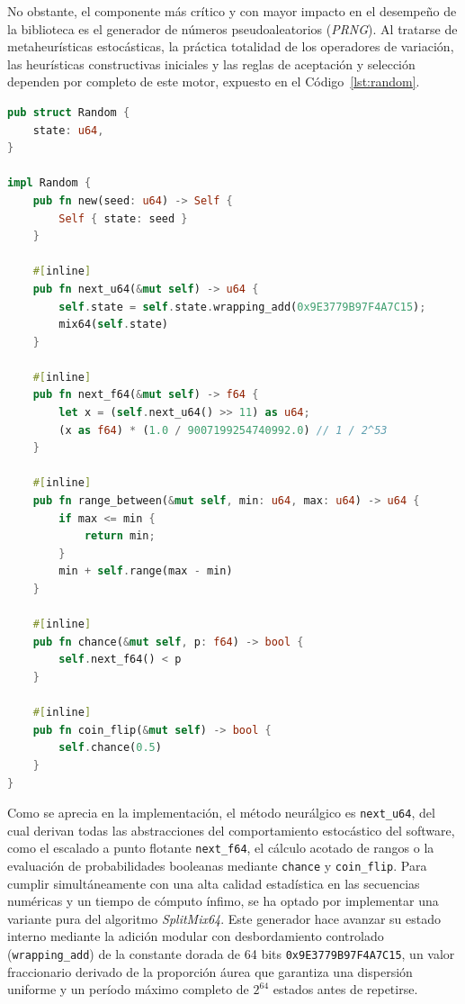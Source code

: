 \documentclass[12pt,a4paper,twoside,openright]{book}
\begin{document}
    No obstante, el componente más crítico y con mayor impacto en el desempeño de la biblioteca es el generador de números pseudoaleatorios (\textit{PRNG}). Al tratarse de metaheurísticas estocásticas, la práctica totalidad de los operadores de variación, las heurísticas constructivas iniciales y las reglas de aceptación y selección dependen por completo de este motor, expuesto en el Código~\ref{lst:random}.

    \begin{lstlisting}[language=Rust, caption={Implementación del generador de números pseudoaleatorios (\textit{PRNG}).}, label={lst:random}]
pub struct Random {
    state: u64,
}

impl Random {
    pub fn new(seed: u64) -> Self {
        Self { state: seed }
    }

    #[inline]
    pub fn next_u64(&mut self) -> u64 {
        self.state = self.state.wrapping_add(0x9E3779B97F4A7C15);
        mix64(self.state)
    }
    
    #[inline]
    pub fn next_f64(&mut self) -> f64 {
        let x = (self.next_u64() >> 11) as u64;
        (x as f64) * (1.0 / 9007199254740992.0) // 1 / 2^53
    }

    #[inline]
    pub fn range_between(&mut self, min: u64, max: u64) -> u64 {
        if max <= min {
            return min;
        }
        min + self.range(max - min)
    }

    #[inline]
    pub fn chance(&mut self, p: f64) -> bool {
        self.next_f64() < p
    }

    #[inline]
    pub fn coin_flip(&mut self) -> bool {
        self.chance(0.5)
    }
}

    \end{lstlisting}
        
        Como se aprecia en la implementación, el método neurálgico es \texttt{next\_u64}, del cual derivan todas las abstracciones del comportamiento estocástico del software, como el escalado a punto flotante \texttt{next\_f64}, el cálculo acotado de rangos o la evaluación de probabilidades booleanas mediante \texttt{chance} y \texttt{coin\_flip}. Para cumplir simultáneamente con una alta calidad estadística en las secuencias numéricas y un tiempo de cómputo ínfimo, se ha optado por implementar una variante pura del algoritmo \textit{SplitMix64}. Este generador hace avanzar su estado interno mediante la adición modular con desbordamiento controlado (\texttt{wrapping\_add}) de la constante dorada de 64 bits \texttt{0x9E3779B97F4A7C15}, un valor fraccionario derivado de la proporción áurea que garantiza una dispersión uniforme y un período máximo completo de $2^{64}$ estados antes de repetirse.
\end{document}
